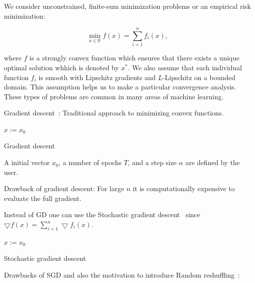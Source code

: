 \documentclass[10pt,conference,compsocconf]{IEEEtran}
\begin{document}
\medskip

We consider unconstrained, finite-sum minimization problems or an
empirical risk minimization:

\begin{equation}\label{eq:finite-sum}
\min_{x \in \mathbb{R}} f(x) = \sum_{i = 1}^n f_i(x),
\end{equation}


\noindent where $f$ is a strongly convex function which ensures that there
exists a unique optimal solution whhich is denoted by $x^*$. We also assume
that each individual function $f_i$ is smooth with Lipschitz gradients and
\mbox{$L$-Lipschitz} on a bounded domain. This assumption helps us to make
a particular convergence analysis.
These types of problems are common in many areas of machine learning.

\medskip

Gradient descent~\cite{GD}:
Traditional approach to minimizing convex functions.

\begin{algorithm}
\SetAlgoLined

  $x:= x_0$ \\
 
 \caption{Gradient descent}
\end{algorithm}
\noindent A initial vector $x_0$, a number of epochs $T$, and
a step size $\alpha$ are defined by the user.

\medskip

Drawback of gradient descent: For large $n$ it is computationally
expensive to evaluate the full gradient.

Instead of GD one can use the Stochastic gradient descent~\cite{SGD} since
$\bigtriangledown f(x) = \sum_{i=1}^n \bigtriangledown f_i(x)$.

\begin{algorithm}
\SetAlgoLined

  $x:= x_0$ \\
 
 \caption{Stochastic gradient descent}
\end{algorithm}

Drawbacks of SGD and also the motivation to introduce Random
reshuffling~\cite{COMPONENTFUNCTION}:
\end{document}

